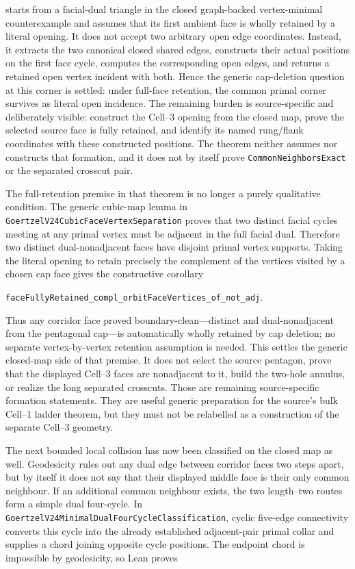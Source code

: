\documentclass[11pt]{article}
\theoremstyle{definition}
\begin{document}
starts from a facial-dual triangle in the closed graph-backed
vertex-minimal counterexample and assumes that its first ambient face is
wholly retained by a literal opening.  It does not accept two arbitrary open
edge coordinates.  Instead, it extracts the two canonical closed shared
edges, constructs their actual positions on the first face cycle, computes
the corresponding open edges, and returns a retained open vertex incident
with both.  Hence the generic cap-deletion question at this corner is settled:
under full-face retention, the common primal corner survives as literal open
incidence.  The remaining burden is source-specific and deliberately visible:
construct the Cell--3 opening from the closed map, prove the selected source
face
is fully retained, and identify its named rung/flank coordinates with these
constructed positions.  The theorem neither assumes nor constructs that
formation, and it does not by itself prove
\texttt{CommonNeighborsExact} or the separated crosscut pair.

The full-retention premise in that theorem is no longer a purely qualitative
condition.  The generic cubic-map lemma in
\texttt{GoertzelV24CubicFaceVertexSeparation} proves that two distinct
facial cycles meeting at any primal vertex must be adjacent in the full
facial dual.  Therefore two distinct dual-nonadjacent faces have disjoint
primal vertex supports.  Taking the literal opening to retain precisely the
complement of the vertices visited by a chosen cap face gives the constructive
corollary

\begin{center}
\texttt{faceFullyRetained\_compl\_orbitFaceVertices\_of\_not\_adj}.
\end{center}

Thus any corridor face proved boundary-clean---distinct and dual-nonadjacent
from the pentagonal cap---is automatically wholly retained by cap deletion;
no separate vertex-by-vertex retention assumption is needed.  This settles
the generic closed-map side of that premise.  It does not select the source
pentagon, prove that the displayed Cell--3 faces are nonadjacent to it, build
the two-hole annulus, or realize the long separated crosscuts.  Those are
remaining source-specific formation statements.  They are useful generic
preparation for the source's bulk Cell--1 ladder theorem, but they must not
be relabelled as a construction of the separate Cell--3 geometry.

The next bounded local collision has now been classified on the closed map as
well.  Geodesicity rules out any dual edge between corridor faces two steps
apart, but by itself it does not say that their displayed middle face is their
only common neighbour.  If an additional common neighbour exists, the two
length--two routes form a simple dual four-cycle.  In
\texttt{GoertzelV24MinimalDualFourCycleClassification}, cyclic five-edge
connectivity converts this cycle into the already established adjacent-pair
primal collar and supplies a chord joining opposite cycle positions.  The
endpoint chord is impossible by geodesicity, so Lean proves
\end{document}
